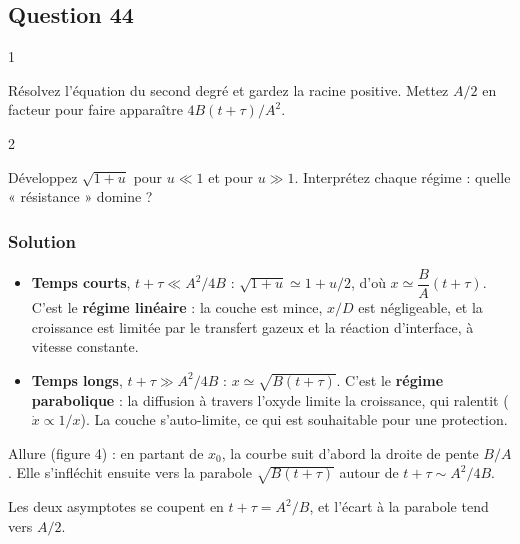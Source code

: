 \documentclass[11pt,a4paper]{article}
\providecommand{\tightlist}{\setlength{\itemsep}{0pt}\setlength{\parskip}{0pt}}
\newcommand{\equationajustee}[1]{%
  \sbox{\boiteequation}{$\displaystyle #1$}%
  \ifdim\wd\boiteequation>\linewidth
    \[\resizebox{\linewidth}{!}{\usebox{\boiteequation}}\]%
  \else
    \[#1\]%
  \fi}
\begin{document}
\hypertarget{question-44}{%
\subsection{Question 44}\label{question-44}}

\begin{indication}{1}

Résolvez l'équation du second degré et gardez la racine positive. Mettez \(A/2\) en facteur pour faire apparaître \(4B(t+\tau)/A^2\).

\end{indication}

\begin{indication}{2}

Développez \(\sqrt{1+u}\) pour \(u\ll1\) et pour \(u\gg1\). Interprétez chaque régime : quelle « résistance » domine ?

\end{indication}

\hypertarget{solution-43}{%
\subsubsection{Solution}\label{solution-43}}

\equationajustee{\boxed{x(t)=\frac A2\left[\sqrt{1+\frac{4B(t+\tau)}{A^2}}-1\right]}}

\begin{itemize}
\tightlist
\item
  \textbf{Temps courts}, \(t+\tau\ll A^2/4B\) : \(\sqrt{1+u}\simeq1+u/2\), d'où \(\boxed{x\simeq\dfrac BA(t+\tau)}\). C'est le \textbf{régime linéaire} : la couche est mince, \(x/D\) est négligeable, et la croissance est limitée par le transfert gazeux et la réaction d'interface, à vitesse constante.
\item
  \textbf{Temps longs}, \(t+\tau\gg A^2/4B\) : \(\boxed{x\simeq\sqrt{B(t+\tau)}}\). C'est le \textbf{régime parabolique} : la diffusion à travers l'oxyde limite la croissance, qui ralentit (\(\dot x\propto1/x\)). La couche s'auto-limite, ce qui est souhaitable pour une protection.
\end{itemize}

Allure (figure 4) : en partant de \(x_0\), la courbe suit d'abord la droite de pente \(B/A\). Elle s'infléchit ensuite vers la parabole \(\sqrt{B(t+\tau)}\) autour de \(t+\tau\sim A^2/4B\).

Les deux asymptotes se coupent en \(t+\tau=A^2/B\), et l'écart à la parabole tend vers \(A/2\).
\end{document}

